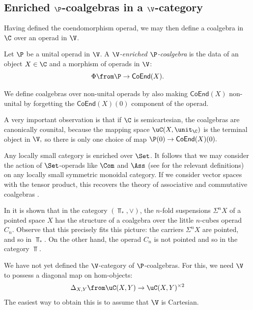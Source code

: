 \documentclass{tac}
\def\bTop{{\Top_\ast}}
\newcommand{\coend}{\mathsf{CoEnd}}
\begin{document}
\subsection{Enriched $\P$-coalgebras in a $\V$-category}
Having defined the coendomorphism operad, we may then define a coalgebra in $\C$ over an operad in $\V$. 
\begin{definition}
\label{coalg}
Let $\P$ be a unital operad in $\V$. 
A \textit{$\V$-enriched $\P$-coalgebra} is the data of an object $X \in \C$ and a morphism of operads in $\V$:
\begin{equation*}
    \Phi\from \P \to \coend (X).
\end{equation*}
\end{definition}
\begin{remark}
    We define coalgebras over non-unital operads by also making $\coend (X)$ non-unital by forgetting the $\coend (X)(0)$ component of the operad. 
\end{remark}
\begin{remark}
    A very important observation is that if $\C$ is semicartesian, the coalgebras are canonically counital, because the mapping space $\uC(X, \unit_{\C})$ is the terminal object in $\V,$ so there is only one choice of map $\P(0) \to \coend(X)(0).$
\end{remark}
\begin{example}
     Any locally small category is enriched over $\Set$. It follows that we may consider the action of $\Set$-operads like $\Com$ and $\Ass$ (see \cite{loday12} for the relevant definitions) on any locally small symmetric monoidal category. If we consider vector spaces with the tensor product, this recovers the theory of associative and commutative coalgebras \cite{loday12}.  
 \end{example}
\begin{example}
\label{me1}
In \cite[Theorem A]{me1} it is shown that in the category  $(\bTop, \vee)$, the $n$-fold suspensions $\Sigma^n X$ of a pointed space $X$ has the structure of a coalgebra over the little $n$-cubes operad $C_n$. Observe that this precisely fits this picture: the carriers $\Sigma^n X$ are pointed, and so in $\Top_\ast$. On the other hand, the operad $C_n$ is not pointed and so in the category $\Top$. 
\end{example}
We have not yet defined the $\V$-category of $\P$-coalgebras. For this, we need $\V$ to possess a diagonal map on hom-objects:
$$
\Delta_{X, Y}\from \uC(X, Y) \to \uC(X, Y)^{\times 2}
$$
The easiest way to obtain this is to assume that $\V$ is Cartesian.
\end{document}
